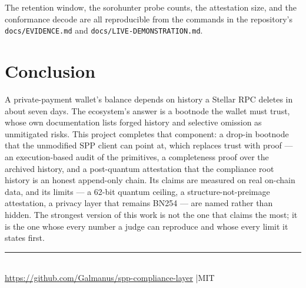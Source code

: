 \documentclass[11pt]{article}
\newcommand{\code}[1]{\texttt{\small #1}}
\begin{document}
The retention window, the sorohunter probe counts, the attestation size, and the
conformance decode are all reproducible from the commands in the repository's
\code{docs/EVIDENCE.md} and \code{docs/LIVE-DEMONSTRATION.md}.

\section{Conclusion}

A private-payment wallet's balance depends on history a Stellar RPC deletes in
about seven days. The ecosystem's answer is a bootnode the wallet must trust,
whose own documentation lists forged history and selective omission as
unmitigated risks. This project completes that component: a drop-in bootnode that
the unmodified SPP client can point at, which replaces trust with proof --- an
execution-based audit of the primitives, a completeness proof over the archived
history, and a post-quantum attestation that the compliance root history is an
honest append-only chain. Its claims are measured on real on-chain data, and its
limits --- a 62-bit quantum ceiling, a structure-not-preimage attestation, a
privacy layer that remains BN254 --- are named rather than hidden. The strongest
version of this work is not the one that claims the most; it is the one whose
every number a judge can reproduce and whose every limit it states first.

\vfill
\begin{center}\small\color{ink}\rule{0.4\linewidth}{0.4pt}\\[0.4em]
\url{https://github.com/Galmanus/spp-compliance-layer} \quad|\quad MIT
\end{center}
\end{document}
